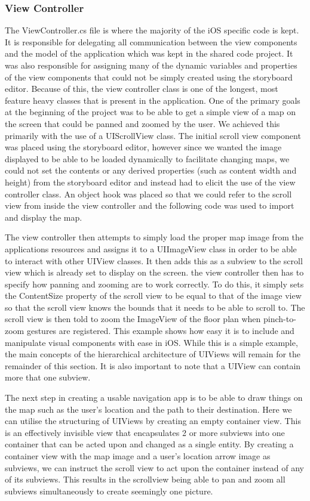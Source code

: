 \documentclass[12pt,a4paper]{report}
\begin{document}
\subsubsection{View Controller}
The ViewController.cs file is where the majority of the iOS specific code is kept. It is responsible for delegating all communication between the view components and the model of the application which was kept in the shared code project. It was also responsible for assigning many of the dynamic variables and properties of the view components that could not be simply created using the storyboard editor. Because of this, the view controller class is one of the longest, most feature heavy classes that is present in the application. One of the primary goals at the beginning of the project was to be able to get a simple view of a map on the screen that could be panned and zoomed by the user. We achieved this primarily with the use of a UIScrollView class. The initial scroll view component was placed using the storyboard editor, however since we wanted the image displayed to be able to be loaded dynamically to facilitate changing maps, we could not set the contents or any derived properties (such as content width and height) from the storyboard editor and instead had to elicit the use of the view controller class. An object hook was placed so that we could refer to the scroll view from inside the view controller and the following code was used to import and display the map.

The view controller then attempts to simply load the proper map image from the applications resources and assigns it to a UIImageView class in order to be able to interact with other UIView classes. It then adds this as a subview to the scroll view which is already set to display on the screen. the view controller then has to specify how panning and zooming are to work correctly. To do this, it simply sets the ContentSize property of the scroll view to be equal to that of the image view so that the scroll view knows the bounds that it needs to be able to scroll to. The scroll view is then told to zoom the ImageView of the floor plan when pinch-to-zoom gestures are registered. This example shows how easy it is to include and manipulate visual components with ease in iOS. While this is a simple example, the main concepts of the hierarchical architecture of UIViews will remain for the remainder of this section. It is also important to note that a UIView can contain more that one subview.

The next step in creating a usable navigation app is to be able to draw things on the map such as the user's location and the path to their destination. Here we can utilise the structuring of UIViews by creating an empty container view. This is an effectively invisible view that encapsulates 2 or more subviews into one container that can be acted upon and changed as a single entity. By creating a container view with the map image and a user's location arrow image as subviews, we can instruct the scroll view to act upon the container instead of any of its subviews. This results in the scrollview being able to pan and zoom all subviews simultaneously to create seemingly one picture. 
\end{document}
